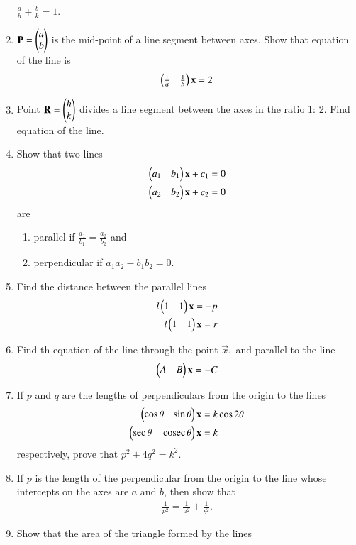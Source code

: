 \begin{enumerate}[label=\arabic*.,ref=\thesubsection.\theenumi]
$\frac{a}{h}+\frac{b}{k}= 1$.
\item $\mathbf{P}=\begin{pmatrix}a\\ b\end{pmatrix}$ is the mid-point of a line segment between axes. Show that equation of the line is
\begin{align}
\begin{pmatrix}\frac{1}{a} & \frac{1}{b}\end{pmatrix}\mathbf{x} = 2
\end{align}
\item  Point $\mathbf{R}= \begin{pmatrix}h\\ k\end{pmatrix}$ divides a line segment between the axes in the ratio 1: 2. Find equation of the line.
\item Show that two lines 
\begin{align}
\begin{pmatrix}a_1 & b_1\end{pmatrix}\mathbf{x} +c_1&= 0
\\
\begin{pmatrix}a_2 & b_2\end{pmatrix}\mathbf{x} +c_2&= 0
\end{align}
are 
\begin{enumerate}
\item parallel if $\frac{a_1}{b_1}=\frac{a_2}{b_2}$ and
\item perpendicular if $a_1a_2-b_1b_2 = 0$.
\end{enumerate}
%
\item Find the distance between the parallel lines
%
\begin{align}
l\begin{pmatrix}1 & 1\end{pmatrix}\mathbf{x} = -p
\\
l\begin{pmatrix}1 & 1\end{pmatrix}\mathbf{x} = r
\end{align}
%
\item Find th equation of the line through the point $\vec{x}_1$ and parallel to the line
%
\begin{align}
\begin{pmatrix}A & B\end{pmatrix}\mathbf{x} = -C
\end{align}
%
\item If $p$ and $q$ are the lengths of perpendiculars from the origin to the lines 
%
\begin{align}
\begin{pmatrix}\cos\theta & \sin\theta\end{pmatrix}\mathbf{x} &= k\cos2\theta
\\
\begin{pmatrix}\sec\theta & \,\text{cosec}\,\theta\end{pmatrix}\mathbf{x} &= k
\end{align}
%
respectively, prove that $p^2+4q^2=k^2$.
\item If $p$ is the length of the perpendicular from the origin to the line whose intercepts on the axes are $a$ and $b$, then show that 
%
\begin{align}
\frac{1}{p^2} = \frac{1}{a^2}+\frac{1}{b^2}.
\end{align}
%
\item Show that the area of the triangle formed by the lines
%
\begin{align}

\end{align}
\end{enumerate}
